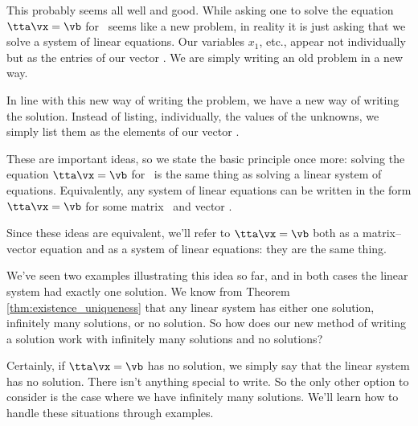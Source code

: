 \medskip

This probably seems all well and good. While asking one to solve the equation $\tta\vx=\vb$ for \vx\ seems like a new problem, in reality it is just asking that we solve a system of linear equations. Our variables $x_1$, etc., appear not individually but as the entries of our vector \vx. We are simply writing an old problem in a new way.

In line with this new way of writing the problem, we have a new way of writing the solution. Instead of listing, individually, the values of the unknowns, we simply list them as the elements of our vector \vx.

These are important ideas, so we state the basic principle once more: solving the equation $\tta\vx=\vb$ for \vx\ is the same thing as solving a linear system of equations. Equivalently, any system of linear equations can be written in the form $\tta\vx=\vb$ for some matrix \tta\ and vector \vb.

Since these ideas are equivalent, we'll refer to $\tta\vx=\vb$ both as a matrix--vector equation and as a system of linear equations: they are the same thing.

We've seen two examples illustrating this idea so far, and in both cases the linear system had exactly one solution. We know from Theorem \ref{thm:existence_uniqueness} that any linear system has either one solution, infinitely many solutions, or no solution. So how does our new method of writing a solution work with infinitely many solutions and no solutions?

Certainly, if $\tta\vx=\vb$ has no solution, we simply say that the linear system has no solution. There isn't anything special to write. So the only other option to consider is the case where we have infinitely many solutions. We'll learn how to handle these situations through examples.

\medskip

